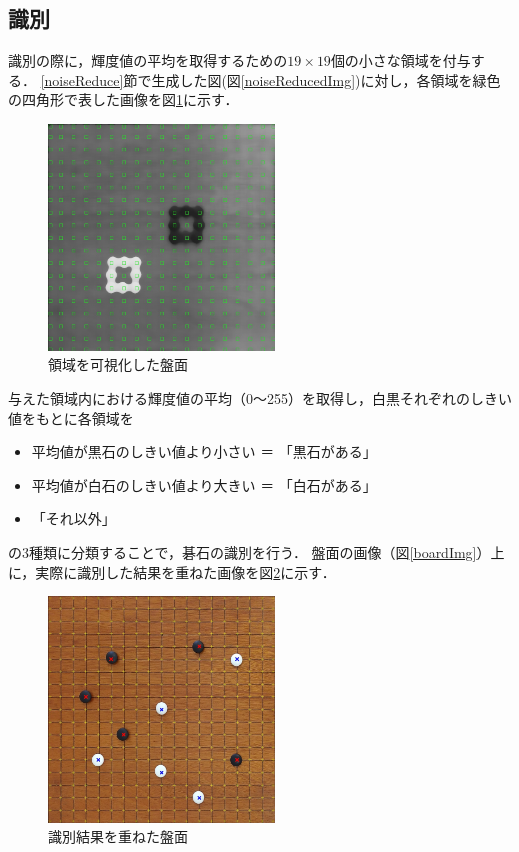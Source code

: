 \documentclass[openright]{nitocs}
\numberwithin{equation}{section}
\begin{document}
        \subsection{識別}
            \label{area}
            識別の際に，輝度値の平均を取得するための$19\times19$個の小さな領域を付与する．
            \ref{noiseReduce}節で生成した図(図\ref{noiseReducedImg})に対し，各領域を緑色の四角形で表した画像を図\ref{boardWithArea}に示す．
            \begin{figure}[tb] %
                \begin{center}
                \includegraphics[clip,width=60mm]{boardWithAreaImg.jpg} 
                \caption{領域を可視化した盤面}
                \label{boardWithArea}
                \end{center}
            \end{figure}

            与えた領域内における輝度値の平均（0～255）を取得し，白黒それぞれのしきい値をもとに各領域を
            \begin{itemize} %
                \item 平均値が黒石のしきい値より小さい ＝ 「黒石がある」
                \item 平均値が白石のしきい値より大きい ＝ 「白石がある」
                \item 「それ以外」
            \end{itemize}
            の3種類に分類することで，碁石の識別を行う．
            盤面の画像（図\ref{boardImg}）上に，実際に識別した結果を重ねた画像を図\ref{result}に示す．

            \begin{figure}[tb] %
                \begin{center}
                \includegraphics[clip,width=60mm]{result.jpg} 
                \caption{識別結果を重ねた盤面}
                \label{result}
                \end{center}
            \end{figure}
\end{document}
